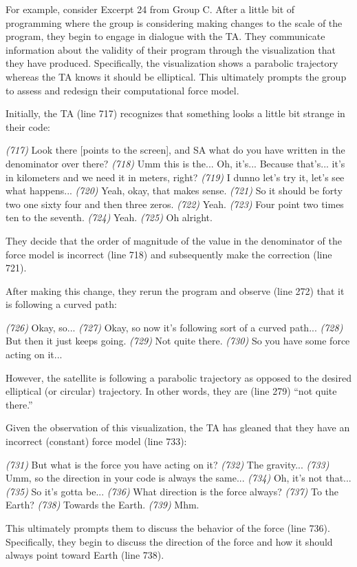 \documentclass{msuphddissertation}
\begin{document}
\begin{doublespace}
For example, consider Excerpt 24 from Group C.  After a little bit of programming where the group is considering making changes to the scale of the program, they begin to engage in dialogue with the TA.  They communicate information about the validity of their program through the visualization that they have produced.  Specifically, the visualization shows a parabolic trajectory whereas the TA knows it should be elliptical.  This ultimately prompts the group to assess and redesign their computational force model.

Initially, the TA (line 717) recognizes that something looks a little bit strange in their code:  \begin{description}
\TA \textit{(717)} Look there [points to the screen], and SA what do you have written in the denominator over there?
\SA \textit{(718)} Umm this is the... Oh, it's... Because that's... it's in kilometers and we need it in meters, right?
\TA \textit{(719)} I dunno let's try it, let's see what happens...
\SA \textit{(720)} Yeah, okay, that makes sense.
\SC \textit{(721)} So it should be forty two one sixty four and then three zeros.
\SA \textit{(722)} Yeah.				
\SA \textit{(723)} Four point two times ten to the seventh.
\SB \textit{(724)} Yeah.
\SC \textit{(725)} Oh alright.
\end{description}  They decide that the order of magnitude of the value in the denominator of the force model is incorrect (line 718) and subsequently make the correction (line 721).

After making this change, they rerun the program and observe (line 272) that it is following a curved path: \begin{description}
\SA \textit{(726)} Okay, so...
\TA \textit{(727)} Okay, so now it's following sort of a curved path...
\SB \textit{(728)} But then it just keeps going.
\TA \textit{(729)} Not quite there.
\TA \textit{(730)} So you have some force acting on it...
\end{description}  However, the satellite is following a parabolic trajectory as opposed to the desired elliptical (or circular) trajectory.  In other words, they are (line 279) ``not quite there.''

Given the observation of this visualization, the TA has gleaned that they have an incorrect (constant) force model (line 733): \begin{description}
\TA \textit{(731)} But what is the force you have acting on it?
\SC \textit{(732)} The gravity...
\TA \textit{(733)} Umm, so the direction {in your code} is always the same...
\SB \textit{(734)} Oh, it's not that...
\SC \textit{(735)} So it's gotta be...	
\TA \textit{(736)} What direction is the force always?
\SC \textit{(737)} To the Earth?
\TA \textit{(738)} Towards the Earth.
\SA \textit{(739)} Mhm.
\end{description}	This ultimately prompts them to discuss the behavior of the force (line 736).  Specifically, they begin to discuss the direction of the force and how it should always point toward Earth (line 738).


\end{doublespace}
\end{document}
